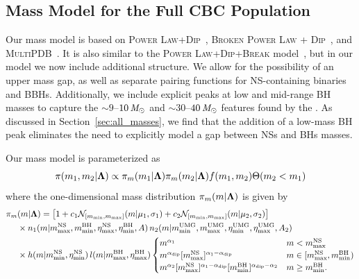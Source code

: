 \subsection{Mass Model for the Full CBC Population}\label{appendix:PDB}

Our \parametricAdj \PDB mass model is based on \textsc{Power Law+Dip}~\citep{Fishbach:2020ryj}, \textsc{Broken Power Law + Dip}~\citep{Farah:2021qom}, and \textsc{MultiPDB}~\citep{Mali:2024wpq}.
It is also similar to the \textsc{Power Law+Dip+Break} model~\citep{KAGRA:2021duu}, but in our \PDB model we now include additional structure.
We allow for the possibility of an upper mass gap, as well as separate pairing functions for \ac{NS}-containing binaries and \acp{BBH}.
Additionally, we include explicit peaks at low and mid-range \ac{BH} masses to capture the $\sim 9$--$10\,\mathit{M_\odot}$ and $\sim 30$--$40\, \mathit{M_\odot}$ features found by the \nonparametrics.
As discussed in Section~\ref{sec:all_masses}, we find that the addition of a low-mass \ac{BH} peak eliminates the need to explicitly model a gap between \acp{NS} and \acp{BH} masses.

Our mass model is parameterized as
\begin{equation}
    \pi(m_1, m_2|\boldsymbol{\Lambda}) \propto \pi_m(m_1|\boldsymbol{\Lambda})\pi_m(m_2|\boldsymbol{\Lambda})f(m_1, m_2)\Theta(m_2 < m_1)
\label{eq: pdb joint mass model}
\end{equation}
where the one-dimensional mass distribution $\pi_m(m|\boldsymbol{\Lambda})$ is given by
\begin{align}
\pi_m&(m|\boldsymbol{\Lambda}) =  \left[1 + c_1 \mathcal{N}_{[m_{\text{min}}, m_{\text{max}}]}(m|\mu_1, \sigma_1) + c_2 \mathcal{N}_{[m_{\text{min}}, m_{\text{max}}]}(m|\mu_2, \sigma_2)\right] \nonumber \\
& \times n_1(m|m_\text{max}^\text{NS}, m_\text{min}^\text{BH}, \eta_\text{max}^\text{NS}, \eta_\text{min}^\text{BH}, A) \, n_2(m|m_\text{min}^\text{UMG}, m_\text{max}^\text{UMG}, \eta_\text{min}^\text{UMG}, \eta_\text{max}^\text{UMG}, A_2) \nonumber \\
& \times h(m|m_\text{min}^\text{NS}, \eta_\text{min}^\text{NS}) \,l(m|m_\text{max}^\text{BH}, \eta_\text{max}^\text{BH}) 
\begin{cases}
m^{\alpha_1} & m < m_\text{max}^\text{NS} \\
m^{\alpha_{\text{dip}}} [m_\text{max}^\text{NS}]^{\alpha_1 - \alpha_{\text{dip}}} &  m \in [m_\text{max}^\text{NS}, m_\text{min}^\text{BH}) \\
m^{\alpha_2} [m_\text{max}^\text{NS}]^{\alpha_1 - \alpha_{\text{dip}}} [m_\text{min}^\text{BH}]^{\alpha_{\text{dip}} - \alpha_2} & m \geq m_\text{min}^\text{BH}.
\end{cases}
\label{eq: pdb mass model}
\end{align}

